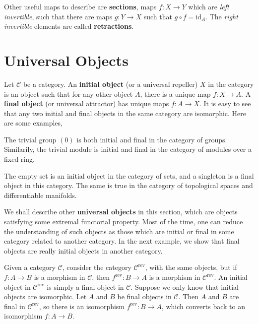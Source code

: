 Other useful maps to describe are {\bf sections}, maps $f: X \to Y$ which are {\it left invertible}, such that there are maps $g: Y \to X$ such that $g \circ f = \text{id}_A$. The {\it right invertible} elements are called {\bf retractions}.

\section{Universal Objects}

Let $\mathcal{C}$ be a category. An {\bf initial object} (or a universal repeller) $X$ in the category is an object such that for any other object $A$, there is a unique map $f: X \to A$. A {\bf final object} (or universal attractor) has unique maps $f: A \to X$. It is easy to see that any two initial and final objects in the same category are isomorphic. Here are some examples,
%
\begin{example}
    The trivial group $(0)$ is both initial and final in the category of groups. Similarily, the trivial module is initial and final in the category of modules over a fixed ring.
\end{example}

\begin{example}
    The empty set is an initial object in the category of sets, and a singleton is a final object in this category. The same is true in the category of topological spaces and differentiable manifolds.
\end{example}

We shall describe other {\bf universal objects} in this section, which are objects satisfying some extremal functorial property. Most of the time, one can reduce the understanding of such objects as those which are initial or final in some category related to another category. In the next example, we show that final objects are really initial objects in another category.

\begin{example}
    Given a category $\mathcal{C}$, consider the category $\mathcal{C}^{\text{rev}}$, with the same objects, but if $f: A \to B$ is a morphism in $\mathcal{C}$, then $f^{\text{rev}}: B \to A$ is a morphism in $\mathcal{C}^{\text{rev}}$. An initial object in $\mathcal{C}^{\text{rev}}$ is simply a final object in $\mathcal{C}$. Suppose we only know that initial objects are isomorphic. Let $A$ and $B$ be final objects in $\mathcal{C}$. Then $A$ and $B$ are final in $\mathcal{C}^{\text{rev}}$, so there is an isomorphism $f^{\text{rev}}: B \to A$, which converts back to an isomorphism $f: A \to B$.
\end{example}

